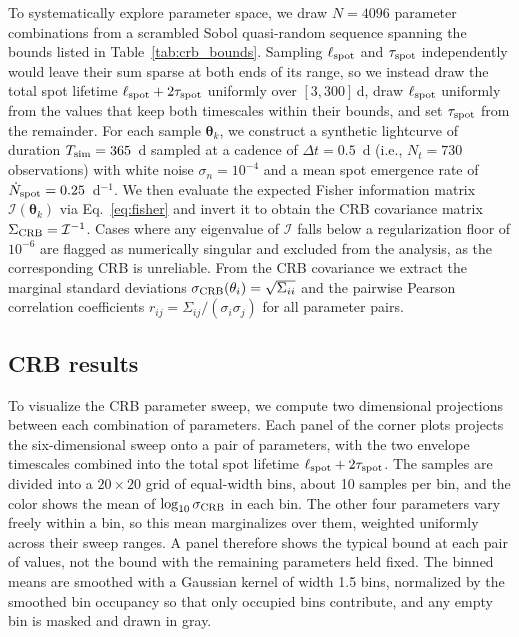 \documentclass[preprint]{aastex702}
\begin{document}
To systematically explore parameter space, we draw $N = 4096$ parameter combinations from a scrambled Sobol quasi-random sequence spanning the bounds listed in Table~\ref{tab:crb_bounds}. Sampling $\ell_{\rm spot}$ and $\tau_{\rm spot}$ independently would leave their sum sparse at both ends of its range, so we instead draw the total spot lifetime $\ell_{\rm spot} + 2\tau_{\rm spot}$ uniformly over $[3, 300]$\,d, draw $\ell_{\rm spot}$ uniformly from the values that keep both timescales within their bounds, and set $\tau_{\rm spot}$ from the remainder. For each sample $\boldsymbol{\theta}_k$, we construct a synthetic lightcurve of duration $T_{\rm sim} = 365$~d sampled at a cadence of $\Delta t = 0.5$~d (i.e., $N_t = 730$ observations) with white noise $\sigma_n = 10^{-4}$ and a mean spot emergence rate of $\dot{N}_{\rm spot} = 0.25$~d$^{-1}$. We then evaluate the expected Fisher information matrix $\mathcal{I}(\boldsymbol{\theta}_k)$ via Eq.~\eqref{eq:fisher} and invert it to obtain the CRB covariance matrix $\Sigma_{\rm CRB} = \mathcal{I}^{-1}$. Cases where any eigenvalue of $\mathcal{I}$ falls below a regularization floor of $10^{-6}$ are flagged as numerically singular and excluded from the analysis, as the corresponding CRB is unreliable. From the CRB covariance we extract the marginal standard deviations $\sigma_{\rm CRB}(\theta_i) = \sqrt{\Sigma_{ii}}$ and the pairwise Pearson correlation coefficients $r_{ij} = \Sigma_{ij}/(\sigma_i \sigma_j)$ for all parameter pairs.

\subsection{CRB results} \label{sec:crb_corner}

To visualize the CRB parameter sweep, we compute two dimensional projections between each combination of parameters. Each panel of the corner plots projects the six-dimensional sweep onto a pair of parameters, with the two envelope timescales combined into the total spot lifetime $\ell_{\rm spot} + 2\tau_{\rm spot}$. The samples are divided into a $20 \times 20$ grid of equal-width bins, about 10 samples per bin, and the color shows the mean of $\log_{10}\sigma_{\rm CRB}$ in each bin. The other four parameters vary freely within a bin, so this mean marginalizes over them, weighted uniformly across their sweep ranges. A panel therefore shows the typical bound at each pair of values, not the bound with the remaining parameters held fixed. The binned means are smoothed with a Gaussian kernel of width 1.5 bins, normalized by the smoothed bin occupancy so that only occupied bins contribute, and any empty bin is masked and drawn in gray.
\end{document}
